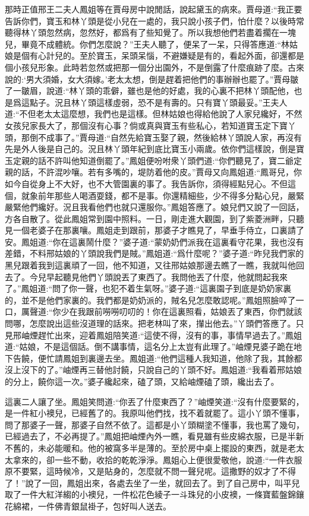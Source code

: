 \begin{parag}
    那時正值邢王二夫人鳳姐等在賈母房中說閒話，說起黛玉的病來。賈母道:“我正要告訴你們，寶玉和林丫頭是從小兒在一處的，我只說小孩子們，怕什麼？以後時常聽得林丫頭忽然病，忽然好，都爲有了些知覺了。所以我想他們若盡着擱在一塊兒，畢竟不成體統。你們怎麼說？”王夫人聽了，便呆了一呆，只得答應道:“林姑娘是個有心計兒的。至於寶玉，呆頭呆惱，不避嫌疑是有的，看起外面，卻還都是個小孩兒形象。此時若忽然或把那一個分出園外，不是倒露了什麼痕跡了麼。古來說的:‘男大須婚，女大須嫁。’老太太想，倒是趕着把他們的事辦辦也罷了。”賈母皺了一皺眉，說道:“林丫頭的乖僻，雖也是他的好處，我的心裏不把林丫頭配他，也是爲這點子。況且林丫頭這樣虛弱，恐不是有壽的。只有寶丫頭最妥。”王夫人道:“不但老太太這麼想，我們也是這樣。但林姑娘也得給他說了人家兒纔好，不然女孩兒家長大了，那個沒有心事？倘或真與寶玉有些私心，若知道寶玉定下寶丫頭，那倒不成事了。”賈母道:“自然先給寶玉娶了親，然後給林丫頭說人家，再沒有先是外人後是自己的。況且林丫頭年紀到底比寶玉小兩歲。依你們這樣說，倒是寶玉定親的話不許叫他知道倒罷了。”鳳姐便吩咐衆丫頭們道:“你們聽見了，寶二爺定親的話，不許混吵嚷。若有多嘴的，堤防着他的皮。”賈母又向鳳姐道:“鳳哥兒，你如今自從身上不大好，也不大管園裏的事了。我告訴你，須得經點兒心。不但這個，就象前年那些人喝酒耍錢，都不是事。你還精細些，少不得多分點心兒，嚴緊嚴緊他們纔好。況且我看他們也就只還服你。”鳳姐答應了。娘兒們又說了一回話，方各自散了。從此鳳姐常到園中照料。一日，剛走進大觀園，到了紫菱洲畔，只聽見一個老婆子在那裏嚷。鳳姐走到跟前，那婆子才瞧見了，早垂手侍立，口裏請了安。鳳姐道:“你在這裏鬧什麼？”婆子道:“蒙奶奶們派我在這裏看守花果，我也沒有差錯，不料邢姑娘的丫頭說我們是賊。”鳳姐道:“爲什麼呢？”婆子道:“昨兒我們家的黑兒跟着我到這裏頑了一回，他不知道，又往邢姑娘那邊去瞧了一瞧，我就叫他回去了。今兒早起聽見他們丫頭說丟了東西了。我問他丟了什麼，他就問起我來了。”鳳姐道:“問了你一聲，也犯不着生氣呀。”婆子道:“這裏園子到底是奶奶家裏的，並不是他們家裏的。我們都是奶奶派的，賊名兒怎麼敢認呢。”鳳姐照臉啐了一口，厲聲道:“你少在我跟前嘮嘮叨叨的！你在這裏照看，姑娘丟了東西，你們就該問哪，怎麼說出這些沒道理的話來。把老林叫了來，攆出他去。”丫頭們答應了。只見邢岫煙趕忙出來，迎着鳳姐陪笑道:“這使不得，沒有的事，事情早過去了。”鳳姐道:“姑娘，不是這個話。倒不講事情，這名分上太豈有此理了。”岫煙見婆子跪在地下告饒，便忙請鳳姐到裏邊去坐。鳳姐道:“他們這種人我知道，他除了我，其餘都沒上沒下的了。”岫煙再三替他討饒，只說自己的丫頭不好。鳳姐道:“我看着邢姑娘的分上，饒你這一次。”婆子纔起來，磕了頭，又給岫煙磕了頭，纔出去了。
\end{parag}


\begin{parag}
    這裏二人讓了坐。鳳姐笑問道:“你丟了什麼東西了？”岫煙笑道:“沒有什麼要緊的，是一件紅小襖兒，已經舊了的。我原叫他們找，找不着就罷了。這小丫頭不懂事，問了那婆子一聲，那婆子自然不依了。這都是小丫頭糊塗不懂事，我也罵了幾句，已經過去了，不必再提了。”鳳姐把岫煙內外一瞧，看見雖有些皮綿衣服，已是半新不舊的，未必能暖和。他的被窩多半是薄的。至於房中桌上擺設的東西，就是老太太拿來的，卻一些不動，收拾的乾乾淨淨。鳳姐心上便很愛敬他，說道:“一件衣服原不要緊，這時候冷，又是貼身的，怎麼就不問一聲兒呢。這撒野的奴才了不得了！”說了一回，鳳姐出來，各處去坐了一坐，就回去了。到了自己房中，叫平兒取了一件大紅洋縐的小襖兒，一件松花色綾子一斗珠兒的小皮襖，一條寶藍盤錦鑲花綿裙，一件佛青銀鼠褂子，包好叫人送去。
\end{parag}


